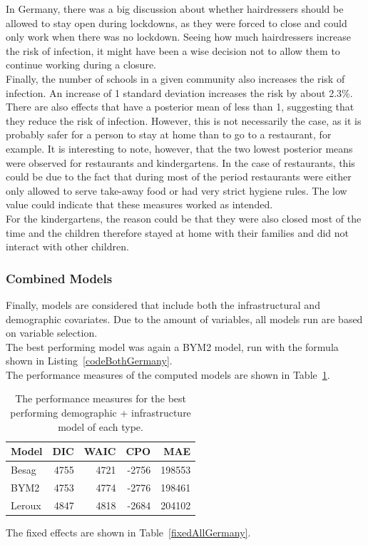 In Germany, there was a big discussion about whether hairdressers should be allowed to stay open during lockdowns, as they were forced to close and could only work when there was no lockdown. Seeing how much hairdressers increase the risk of infection, it might have been a wise decision not to allow them to continue working during a closure. \\
Finally, the number of schools in a given community also increases the risk of infection. An increase of 1 standard deviation increases the risk by about 2.3\%.
\\
There are also effects that have a posterior mean of less than 1, suggesting that they reduce the risk of infection. However, this is not necessarily the case, as it is probably safer for a person to stay at home than to go to a restaurant, for example. It is interesting to note, however, that the two lowest posterior means were observed for restaurants and kindergartens. In the case of restaurants, this could be due to the fact that during most of the period restaurants were either only allowed to serve take-away food or had very strict hygiene rules. The low value could indicate that these measures worked as intended. \\
For the kindergartens, the reason could be that they were also closed most of the time and the children therefore stayed at home with their families and did not interact with other children.
\subsubsection{Combined Models}
Finally, models are considered that include both the infrastructural and demographic covariates. Due to the amount of variables, all models run are based on variable selection. \\
The best performing model was again a BYM2 model, run with the formula shown in Listing~\ref{codeBothGermany}. \\
The performance measures of the computed models are shown in Table~\ref{allGermany}.
\begin{table}[H] 
\caption{The performance measures for the best performing demographic + infrastructure model of each type. \label{allGermany}}
\begin{tabular}{l r r r r}
\toprule
\textbf{Model}	& \textbf{DIC}	& \textbf{WAIC} & \textbf{CPO} & \textbf{MAE}\\
\midrule
Besag&  4755 & 4721 & -2756 & 198553\\
BYM2 & 4753 & 4774 & -2776 & 198461\\
Leroux & 4847 & 4818 & -2684 & 204102 \\
\bottomrule
\end{tabular}
\end{table}
The fixed effects are shown in Table~\ref{fixedAllGermany}.

